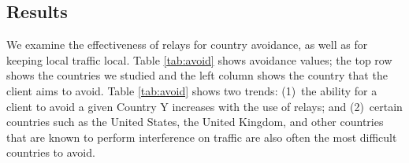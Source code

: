 \subsection{Results}

We examine the
effectiveness of relays for country avoidance, as well as for keeping local
traffic local.  Table \ref{tab:avoid} shows avoidance values; the top
row shows the countries we studied and the left column shows the country
that the client aims to avoid.
%
Table \ref{tab:avoid} shows two trends: (1)~the ability
for a client to avoid a given Country Y increases with the use of relays; and (2)~certain
countries such as the United States, the United Kingdom, and other countries that
are known to perform interference on traffic are also often the most difficult countries
to avoid.

